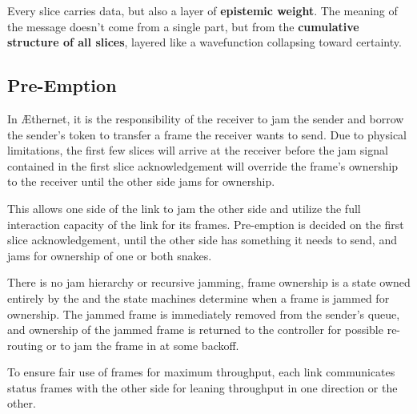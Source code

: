 \documentclass[../OAE-SPEC-MAIN.tex]{subfiles}
\begin{document}
Every slice carries data, but also a layer of \textbf{epistemic weight}. The meaning of the message doesn't come from a single part, but from the \textbf{cumulative structure of all slices}, layered like a wavefunction collapsing toward certainty.



\subsection{Pre-Emption}

In \AE thernet, it is the responsibility of the receiver to jam the sender and borrow the sender's token to transfer a frame the receiver wants to send. Due to physical limitations, the first few slices will arrive at the receiver before the jam signal contained in the first slice acknowledgement will override the frame's ownership to the receiver until the other side jams for ownership.

This allows one side of the link to jam the other side and utilize the full interaction capacity of the link for its frames. Pre-emption is decided on the first slice acknowledgement, until the other side has something it needs to send, and jams for ownership of one or both snakes. 

There is no jam hierarchy or recursive jamming, frame ownership is a state owned entirely by the \LINK and the \LINK state machines determine when a frame is jammed for ownership. The jammed frame is immediately removed from the sender's queue, and ownership of the jammed frame is returned to the controller for possible re-routing or to jam the frame in at some backoff.

To ensure fair use of frames for maximum throughput, each link communicates status frames with the other side for leaning throughput in one direction or the other.







\end{document}
